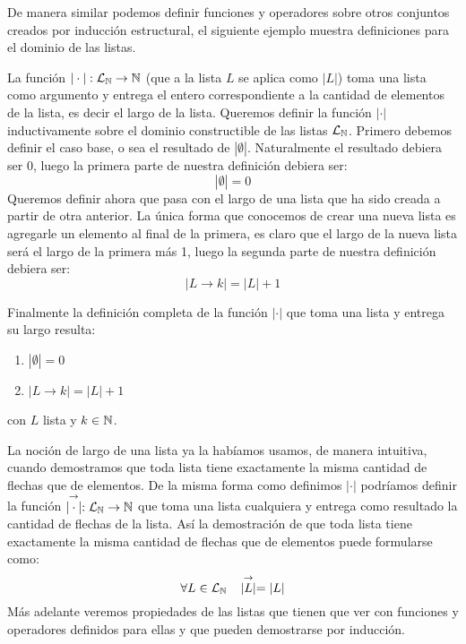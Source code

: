 De manera similar podemos definir funciones y operadores sobre otros conjuntos creados por inducción estructural, el siguiente ejemplo muestra definiciones para el dominio de las listas.

\begin{ejemplo}
La función $|\cdot|:\mathcal{L}_{\mathbb{N}}\rightarrow\mathbb{N}$ (que a la lista $L$ se aplica como $|L|$) toma una lista como argumento y entrega el entero correspondiente a la cantidad de elementos de la lista, es decir el largo de la lista.
Queremos definir la función $|\cdot|$ inductivamente sobre el dominio constructible de las listas $\mathcal{L}_{\mathbb{N}}$.
Primero debemos definir el caso base, o sea el resultado de $|\emptyset|$.
Naturalmente el resultado debiera ser $0$, luego la primera parte de nuestra definición debiera ser:
\[
|\emptyset| = 0
\]
Queremos definir ahora que pasa con el largo de una lista que ha sido creada a partir de otra anterior.
La única forma que conocemos de crear una nueva lista es agregarle un elemento al final de la primera, es claro que el largo de la nueva lista será el largo de la primera más 1, luego la segunda parte de nuestra definición debiera ser:
\[
|L\rightarrow k|=|L|+1
\]

Finalmente la definición completa de la función $|\cdot|$ que toma una lista y entrega su largo resulta:
\begin{enumerate}
\itemsep 0pt
\item $|\emptyset|=0$
\item $|L\rightarrow k|=|L|+1$
\end{enumerate}
con $L$ lista y $k\in\mathbb{N}$.
\end{ejemplo}

La noción de largo de una lista ya la habíamos usamos, de manera intuitiva, cuando demostramos que toda lista tiene exactamente la misma cantidad de flechas que de elementos.
De la misma forma como definimos $|\cdot|$ podríamos definir la función $\stackrel{\rightarrow}{|\cdot|}:\mathcal{L}_{\mathbb{N}}\rightarrow\mathbb{N}$ que toma una lista cualquiera y entrega como resultado la cantidad de flechas de la lista.
Así la demostración de que toda lista tiene exactamente la misma cantidad de flechas que de elementos puede formularse como:
\[
\forall L\in\mathcal{L}_{\mathbb{N}}\;\;\;\stackrel{\rightarrow}{|L|}=|L|
\]
Más adelante veremos propiedades de las listas que tienen que ver con funciones y operadores definidos para ellas y que pueden demostrarse por inducción.


